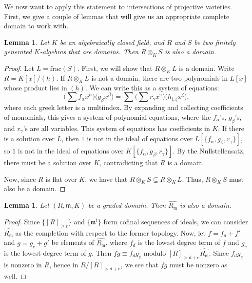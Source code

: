 \documentclass[11pt]{book}
\newtheorem{lemma}[theorem]{Lemma}
\numberwithin{equation}{section}
\numberwithin{theorem}{chapter}
\theoremstyle{definition}
\newtheorem*{basic properties}{Basic Properties}
\newtheorem*{Important Remark}{Important Remark}
\theoremstyle{remark}
\newcommand{\m}{\mathfrak{m}}
\begin{document}
We now want to apply this statement to intersections of projective varieties. First, we give a couple of lemmas that will give us an appropriate complete domain to work with.

\begin{lemma}
	Let $K$ be an algebraically closed field, and $R$ and $S$ be two finitely generated $K$-algebras that are domains. Then $R\otimes_K S$ is also a domain.
\end{lemma}
\begin{proof}
	Let $L=\mathrm{frac}(S)$. First, we will show that $R\otimes_K L$ is a domain. Write $R=K[\underline{x}]/(\underline{h})$. If $R\otimes_K L$ is not a domain, there are two polynomials in $L[\underline{x}]$ whose product lies in $(\underline{h})$. We can write this as a system of equations:
	\[ \Big(\sum f_{\alpha} x^{\alpha} \Big) \Big( g_\beta x^{\beta} \Big) = \sum \Big( \sum r_{\gamma} x^{\gamma} \Big) \Big( h_{i, \zeta} x^{\zeta} \Big), \]
	where each greek letter is a multiindex. By expanding and collecting coefficients of monomials, this gives a system of polynomial equations, where the $f_\alpha$'s, $g_\beta$'s, and $r_\gamma$'s are all variables. This system of equations has coefficients in $K$. If there is a solution over $L$, then $1$ is not in the ideal of equations over $L[\{ f_\alpha , g_\beta, r_\gamma \}]$, so $1$ is not in the ideal of equations over  $K[\{ f_\alpha , g_\beta, r_\gamma \}]$. By the Nullstellensatz, there must be a solution over $K$, contradicting that $R$ is a domain.
	
	Now, since $R$ is flat over $K$, we have that $R\otimes_K S \subseteq R \otimes_K L$. Thus, $R\otimes_K S$ must also be a domain.
\end{proof}

\begin{lemma}
	Let $(R,\m,K)$ be a graded domain. Then $\widehat{R_\m}$ is also a domain.
\end{lemma}
\begin{proof}
	Since $\{[R]_{\geq t}\}$ and $\{\m^t\}$ form cofinal sequences of ideals, we can consider $\widehat{R_\m}$ as the completion with respect to the former topology. Now, let $f=f_d+f'$ and $g=g_e+g'$ be elements of $\widehat{R_\m}$, where $f_d$ is the lowest degree term of $f$ and $g_e$ is the lowest degree term of $g$. Then $fg\equiv f_d g_e$ modulo $[R]_{> d+e}\widehat{R_\m}$. Since $f_d g_e$ is nonzero in $R$, hence in $R/[R]_{> d+e}$, we see that $fg$ must be nonzero as well.
\end{proof}
\end{document}
